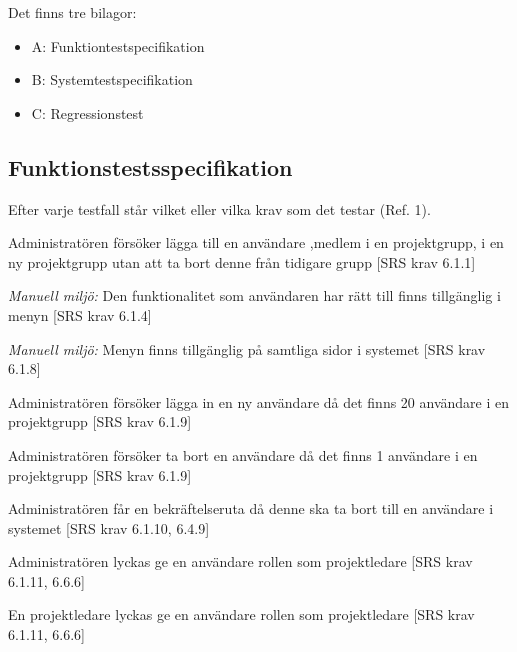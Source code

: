\documentclass[a4paper]{article}
\begin{document}
Det finns tre bilagor:

\begin{itemize}
\item A: Funktiontestspecifikation
\item B: Systemtestspecifikation
\item C: Regressionstest

\end{itemize}

\newpage

\begin{appendices}

\section{Funktionstestsspecifikation}
Efter varje testfall står vilket eller vilka krav som det testar (Ref. 1).

\begin{FT}


\item
Administratören försöker lägga till en användare ,medlem i en projektgrupp, i en ny projektgrupp utan att ta bort denne från tidigare grupp [SRS krav 6.1.1]

\item
\emph{Manuell miljö:} Den funktionalitet som användaren har rätt till finns tillgänglig i menyn [SRS krav 6.1.4]

\item
\emph{Manuell miljö:} Menyn finns tillgänglig på samtliga sidor i systemet [SRS krav 6.1.8]

\item
Administratören försöker lägga in en ny användare då det finns 20 användare i en projektgrupp [SRS krav 6.1.9]

\item
Administratören försöker ta bort en användare då det finns 1 användare i en projektgrupp [SRS krav 6.1.9]

\item
Administratören får en bekräftelseruta då denne ska ta bort till en användare i systemet [SRS krav 6.1.10, 6.4.9]

\item
Administratören lyckas ge en användare rollen som projektledare [SRS krav 6.1.11, 6.6.6]

\item
En projektledare lyckas ge en användare rollen som projektledare [SRS krav 6.1.11, 6.6.6]


\end{FT}
\end{appendices}
\end{document}
